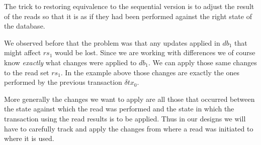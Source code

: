 \documentclass[11pt,a4paper]{article}
\begin{document}
\begin{center}
\end{center}
The trick to restoring equivalence to the sequential version is to adjust the
result of the reads so that it is as if they had been performed against the
right state of the database.

We observed before that the problem was that any updates applied in
$\mathit{db}_1$ that might affect $\mathit{rs}_1$ would be lost. Since we are
working with differences we of course know \emph{exactly} what changes were
applied to $\mathit{db}_1$. We can apply those same changes to the read set
$\mathit{rs}_1$. In the example above those changes are exactly the ones
performed by the previous transaction $\delta\mathit{tx}_0$.

More generally the changes we want to apply are all those that occurred between
the state against which the read was performed and the state in which the
transaction using the read results is to be applied. Thus in our designs we
will have to carefully track and apply the changes from where a read was
initiated to where it is used.
\end{document}
